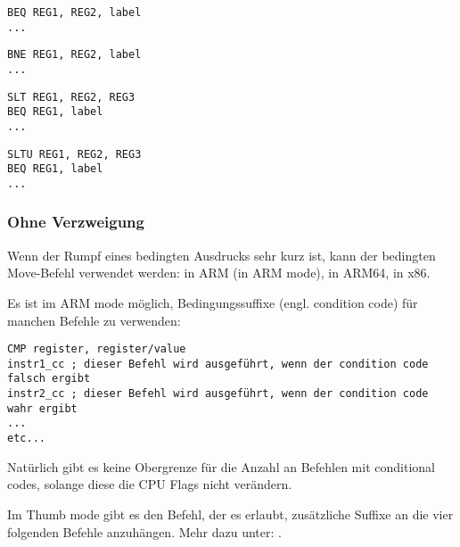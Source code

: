 \begin{lstlisting}[caption=Prüfe auf Gleichheit,style=customasmMIPS]
BEQ REG1, REG2, label
...
\end{lstlisting}

\begin{lstlisting}[caption=Prüfe auf Ungleichheit,style=customasmMIPS]
BNE REG1, REG2, label
...
\end{lstlisting}

\begin{lstlisting}[caption=Prüfe auf größer{,} größer als
(vorzeichenbehaftet),style=customasmMIPS] SLT REG1, REG2, REG3
BEQ REG1, label
...
\end{lstlisting}

\begin{lstlisting}[caption=Prüfe auf kleiner{,} kleiner als
(vorzeichenlos),style=customasmMIPS] SLTU REG1, REG2, REG3
BEQ REG1, label
...
\end{lstlisting}

\subsubsection{Ohne Verzweigung}

Wenn der Rumpf eines bedingten Ausdrucks sehr kurz ist, kann der bedingten
Move-Befehl verwendet werden:
 in ARM (in ARM mode),  in ARM64,  in x86.

Es ist im ARM mode möglich, Bedingungssuffixe (engl. condition code) für manchen
Befehle zu verwenden:

\begin{lstlisting}[caption=ARM (\ARMMode),style=customasmARM]
CMP register, register/value
instr1_cc ; dieser Befehl wird ausgeführt, wenn der condition code falsch ergibt
instr2_cc ; dieser Befehl wird ausgeführt, wenn der condition code wahr ergibt
...
etc...
\end{lstlisting}
Natürlich gibt es keine Obergrenze für die Anzahl an Befehlen mit conditional
codes, solange diese die CPU Flags nicht verändern.


Im Thumb mode gibt es den  Befehl, der es erlaubt, zusätzliche Suffixe
an die vier folgenden Befehle anzuhängen. Mehr dazu unter: .



